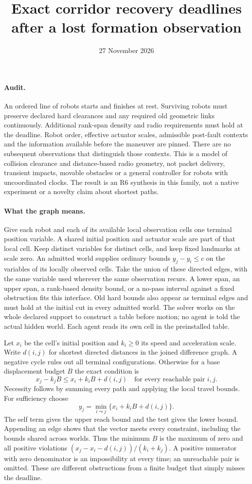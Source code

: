 \documentclass[11pt]{article}
\title{Exact corridor recovery deadlines after a lost formation observation}
\date{27 November 2026}
\begin{document}
\maketitle

\paragraph{Audit.}
An ordered line of robots starts and finishes at rest. Surviving
robots must preserve declared hard clearances and any required old
geometric links continuously. Additional rank-span density and radio
requirements must hold at the deadline. Robot order, effective
actuator scales, admissible post-fault contexts and the information
available before the maneuver are pinned. There are no subsequent
observations that distinguish those contexts. This is a model of
collision clearance and distance-based radio geometry, not packet
delivery, transient impacts, movable obstacles or a general
controller for robots with uncoordinated clocks. The result is an
R6 synthesis in this family, not a native experiment or a novelty
claim about shortest paths.

\paragraph{What the graph means.}
Give each robot and each of its available local observation cells one
terminal position variable. A shared initial position and actuator
scale are part of that local cell. Keep distinct variables for distinct
cells, and keep fixed landmarks at scale zero. An admitted world
supplies ordinary bounds \(y_j-y_i\le c\) on the variables of its
locally observed cells. Take the union of these directed edges, with
the same variable used wherever the same observation recurs. A lower
span, an upper span, a rank-based density bound, or a no-pass interval
against a fixed obstruction fits this interface. Old hard bounds also
appear as terminal edges and must hold at the initial cut in every
admitted world. The solver works on the whole declared support to
construct a table before motion; no agent is told the actual hidden
world. Each agent reads its own cell in the preinstalled table.

Let \(x_i\) be the cell's initial position and \(k_i\ge0\) its speed
and acceleration scale. Write \(d(i,j)\) for shortest directed
distances in the joined difference graph. A negative cycle rules out
all terminal configurations. Otherwise for a base displacement
budget \(B\) the exact condition is
\[
 x_j-k_jB\le x_i+k_iB+d(i,j)
 \quad\text{for every reachable pair }i,j .
\]
Necessity follows by summing every path and applying the local
travel bounds. For sufficiency choose
\[
 y_j=\min_{i\leadsto j}\{x_i+k_iB+d(i,j)\}.
\]
The self term gives the upper reach bound and the test gives the
lower bound. Appending an edge shows that the vector meets every
constraint, including the bounds shared across worlds. Thus the
minimum \(B\) is the maximum of zero and all positive violations
\((x_j-x_i-d(i,j))/(k_i+k_j)\). A positive numerator with zero
denominator is an impossibility at every time; an unreachable
pair is omitted. These are different obstructions from a finite
budget that simply misses the deadline.
\end{document}
